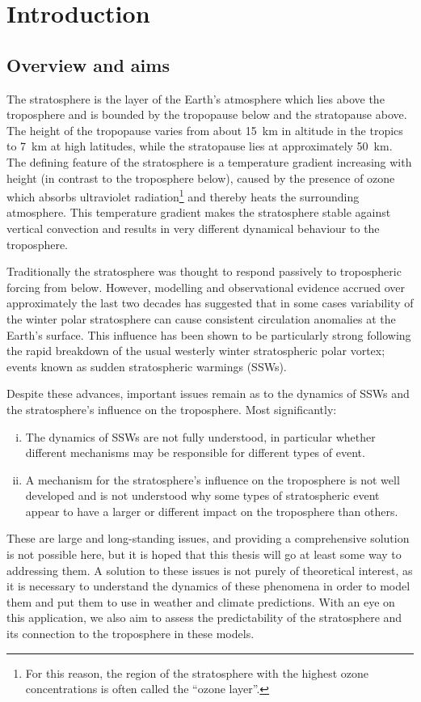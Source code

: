\chapter{Introduction}
\label{cha:intro}

\section{Overview and aims}
The stratosphere is the layer of the Earth's atmosphere which lies above the
troposphere and is bounded by the tropopause below and the stratopause
above. The height of the tropopause varies from about 15~km in altitude in the
tropics to 7~km at high latitudes, while the stratopause lies at approximately
50~km. The defining feature of the stratosphere is a temperature gradient
increasing with height (in contrast to the troposphere below), caused by the
presence of ozone which absorbs ultraviolet radiation\footnote{For this reason,
  the region of the stratosphere with the highest ozone concentrations is often
  called the ``ozone layer''.}  and thereby heats the surrounding
atmosphere. This temperature gradient makes the stratosphere stable against
vertical convection and results in very different dynamical behaviour to the
troposphere.

Traditionally the stratosphere was thought to respond passively to tropospheric
forcing from below. However, modelling and observational evidence accrued over
approximately the last two decades has suggested that in some cases variability
of the winter polar stratosphere can cause consistent circulation anomalies at
the Earth's surface. This influence has been shown to be particularly strong
following the rapid breakdown of the usual westerly winter stratospheric polar
vortex; events known as sudden stratospheric warmings (SSWs). 

Despite these advances, important issues remain as to the dynamics of SSWs
and the stratosphere's influence on the troposphere. Most significantly:
\begin{enumerate}[i.]
\item The dynamics of SSWs are not fully understood, in particular whether
  different mechanisms may be responsible for different types of event.
\item A mechanism for the stratosphere's influence on the troposphere is not
  well developed and is not understood why some types of stratospheric event
  appear to have a larger or different impact on the troposphere than others.
\end{enumerate}
These are large and long-standing issues, and providing a comprehensive solution
is not possible here, but it is hoped that this thesis will go at least some way
to addressing them. A solution to these issues is not purely of theoretical
interest, as it is necessary to understand the dynamics of these phenomena in
order to model them and put them to use in weather and climate predictions. With
an eye on this application, we also aim to assess the predictability of the
stratosphere and its connection to the troposphere in these models.

